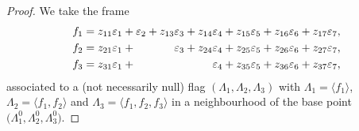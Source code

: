 \documentclass[11pt]{article}
\numberwithin{equation}{section}
\numberwithin{equation}{section}
\theoremstyle{definition}
\newcommand{\0}{\boldsymbol{0}}
\begin{document}
\begin{proof}
We take the frame
\begin{align*}
f_1 & = z_{11}\varepsilon_1 + \varepsilon_2 + z_{13} \varepsilon_3 + z_{14} \varepsilon_4 + z_{15} \varepsilon_5 +
z_{16} \varepsilon_6 + z_{17} \varepsilon_7,
\\
f_2 & = z_{21}\varepsilon_1 + \hphantom{\varepsilon_2 + z_{13}} \varepsilon_3 + z_{24} \varepsilon_4 + z_{25} \varepsilon_5 + z_{26} \varepsilon_6 + z_{27} \varepsilon_7,
\\
f_3 & = z_{31}\varepsilon_1 + \hphantom{\varepsilon_2 + z_{13} \varepsilon_3 + z_{14}} \varepsilon_4 + z_{35} \varepsilon_5 +
z_{36} \varepsilon_6 + z_{37} \varepsilon_7,
\end{align*}
associated to a (not necessarily null) flag $(\Lambda_1, \Lambda_2, \Lambda_3)$
with $\Lambda_1 = \langle f_1\rangle$, $\Lambda_2 = \langle f_1, f_2\rangle$ and $\Lambda_3 = \langle f_1, f_2, f_3\rangle$ in a neighbourhood of the base point $\bigl(\Lambda_1^0, \Lambda_2^0, \Lambda_3^0\bigr)$.


\end{proof}
\end{document}
